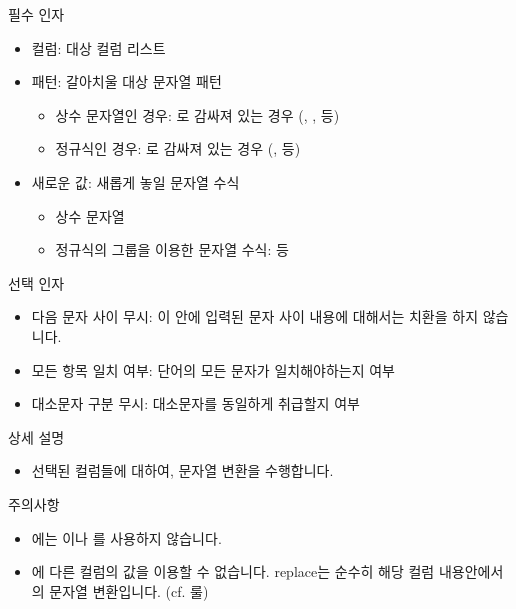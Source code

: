 \documentclass[letterpaper,10pt,english]{sphinxmanual}
\begin{document}
필수 인자
\begin{itemize}
\item {} 
컬럼: 대상 컬럼 리스트

\item {} 
패턴: 갈아치울 대상 문자열 패턴
\begin{itemize}
\item {} 
상수 문자열인 경우: 로 감싸져 있는 경우 (, ,  등)

\item {} 
정규식인 경우: \sphinxcode{\sphinxupquote{/}}로 감싸져 있는 경우 (\sphinxcode{\sphinxupquote{/{[} ,\_{]}+/}},  등)

\end{itemize}

\item {} 
새로운 값: 새롭게 놓일 문자열 수식
\begin{itemize}
\item {} 
상수 문자열

\item {} 
정규식의 그룹을 이용한 문자열 수식:  등

\end{itemize}

\end{itemize}

선택 인자
\begin{itemize}
\item {} 
다음 문자 사이 무시: 이 안에 입력된 문자 사이 내용에 대해서는 치환을 하지 않습니다.

\item {} 
모든 항목 일치 여부: 단어의 모든 문자가 일치해야하는지 여부

\item {} 
대소문자 구분 무시: 대소문자를 동일하게 취급할지 여부

\end{itemize}

상세 설명
\begin{itemize}
\item {} 
선택된 컬럼들에 대하여, 문자열 변환을 수행합니다.

\end{itemize}

주의사항
\begin{itemize}
\item {} 
에는 이나 \sphinxcode{\sphinxupquote{/}}를 사용하지 않습니다.

\item {} 
에 다른 컬럼의 값을 이용할 수 없습니다. replace는 순수히 해당 컬럼 내용안에서의 문자열 변환입니다. (cf. {\hyperref[\detokenize{discovery/part07/rule_kinds:set}]{}} 룰)

\end{itemize}
\end{document}
